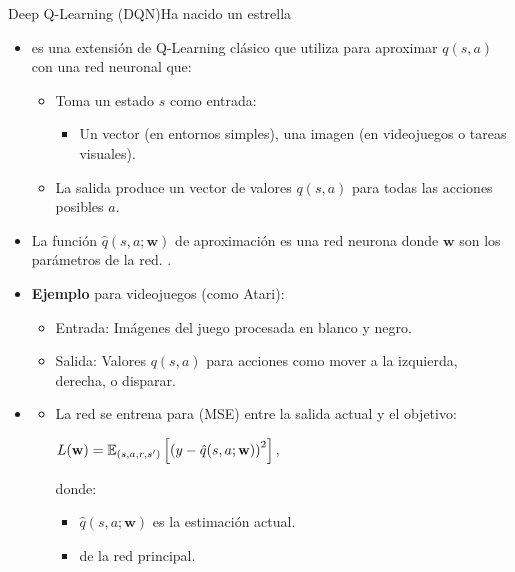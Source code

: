 \documentclass[10pt, envcountsect, handout, aspectratio=1610, hyperref={hypertexnames=true}]{beamer}
\begin{document}
\begin{frame}{Deep Q-Learning (DQN)}{Ha nacido un estrella \citep{mnih2013playing} \citep{mnih2015human}} \nocite{whitaker_human_level_control}  \nocite{lapan2018deep}
%	



	\begin{itemize}
		\item {} es una extensión de Q-Learning clásico que utiliza  para aproximar \(q(s, a)\) con una red neuronal que:
		\begin{itemize}
			\item Toma un estado \(s\) como entrada:
			\begin{itemize}
				\item Un vector (en entornos simples),  una imagen (en videojuegos o tareas visuales).
			\end{itemize}
			
			\item La salida produce un vector de valores \(q(s, a)\) para todas las acciones posibles \(a\).
		\end{itemize}
		\item  	La función \(\hat{q}(s, a; \mathbf{w})\) de aproximación es una red neurona donde \(\mathbf{w}\) son los parámetros de la red.
.
		\item \textbf{Ejemplo} para videojuegos (como Atari):
		\begin{itemize}
			\item Entrada: Imágenes del juego procesada en blanco y negro.
			\item Salida: Valores \(q(s, a)\) para acciones como mover a la izquierda, derecha, o disparar.
		\end{itemize}

		\item {}
		
		\begin{itemize}
			\item La red se entrena para  (MSE) entre la salida actual y el objetivo:
			
			\centerline{\large$\displaystyle
			L(\mathbf{w}) = \mathbb{E}_{(s, a, r, s')}\left[\left(y - \hat{q}(s, a; \mathbf{w})\right)^2\right],
			$}
			donde:
			\begin{itemize}
				\item \(\hat{q}(s, a; \mathbf{w})\) es la estimación actual.
				\item {} de la red principal.


\end{itemize}
\end{itemize}
\end{itemize}
\end{frame}
\end{document}
